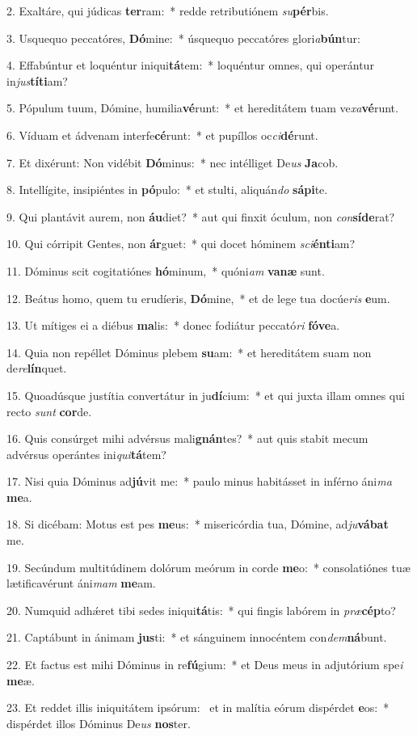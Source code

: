 2. Exaltáre, qui júdicas \textbf{ter}ram:~*  redde retributiónem \textit{su}\textbf{pér}bis.\

3. Usquequo peccatóres, \textbf{Dó}mine:~*  úsquequo peccatóres glori\textit{a}\textbf{bún}tur:\

4. Effabúntur et loquéntur iniqui\textbf{tá}tem:~*  loquéntur omnes, qui operántur in\textit{jus}\textbf{tí}\textbf{ti}am?\

5. Pópulum tuum, Dómine, humilia\textbf{vé}runt:~*  et hereditátem tuam ve\textit{xa}\textbf{vé}runt.\

6. Víduam et ádvenam interfe\textbf{cé}runt:~*  et pupíllos oc\textit{ci}\textbf{dé}runt.\

7. Et dixérunt: Non vidébit \textbf{Dó}minus:~*  nec intélliget De\textit{us} \textbf{Ja}cob.\

8. Intellígite, insipiéntes in \textbf{pó}pulo:~*  et stulti, aliquán\textit{do} \textbf{sá}\textbf{pi}te.\

9. Qui plantávit aurem, non \textbf{áu}diet?~*  aut qui finxit óculum, non \textit{con}\textbf{sí}\textbf{de}rat?\

10. Qui córripit Gentes, non \textbf{ár}guet:~*  qui docet hóminem \textit{sci}\textbf{én}\textbf{ti}am?\

11. Dóminus scit cogitatiónes \textbf{hó}minum,~*  quóni\textit{am} \textbf{va}\textbf{næ} sunt.\

12. Beátus homo, quem tu erudíeris, \textbf{Dó}mine,~*  et de lege tua docúe\textit{ris} \textbf{e}um.\

13. Ut mítiges ei a diébus \textbf{ma}lis:~*  donec fodiátur peccató\textit{ri} \textbf{fó}\textbf{ve}a.\

14. Quia non repéllet Dóminus plebem \textbf{su}am:~*  et hereditátem suam non de\textit{re}\textbf{lín}quet.\

15. Quoadúsque justítia convertátur in ju\textbf{dí}cium:~*  et qui juxta illam omnes qui recto \textit{sunt} \textbf{cor}de.\

16. Quis consúrget mihi advérsus mali\textbf{gnán}tes?~*  aut quis stabit mecum advérsus operántes ini\textit{qui}\textbf{tá}tem?\

17. Nisi quia Dóminus ad\textbf{jú}vit me:~*  paulo minus habitásset in inférno áni\textit{ma} \textbf{me}a.\

18. Si dicébam: Motus est pes \textbf{me}us:~*  misericórdia tua, Dómine, ad\textit{ju}\textbf{vá}\textbf{bat} me.\

19. Secúndum multitúdinem dolórum meórum in corde \textbf{me}o:~*  consolatiónes tuæ lætificavérunt áni\textit{mam} \textbf{me}am.\

20. Numquid adhǽret tibi sedes iniqui\textbf{tá}tis:~*  qui fingis labórem in \textit{præ}\textbf{cép}to?\

21. Captábunt in ánimam \textbf{jus}ti:~*  et sánguinem innocéntem con\textit{dem}\textbf{ná}bunt.\

22. Et factus est mihi Dóminus in re\textbf{fú}gium:~*  et Deus meus in adjutórium spe\textit{i} \textbf{me}æ.\

23. Et reddet illis iniquitátem ipsórum: \dag\  et in malítia eórum dispérdet \textbf{e}os:~*  dispérdet illos Dóminus De\textit{us} \textbf{nos}ter.\

